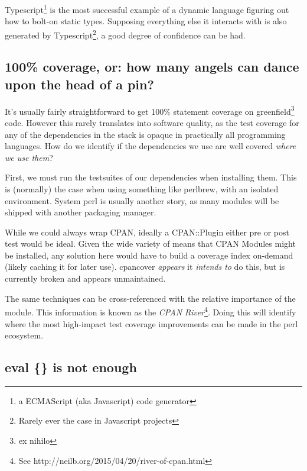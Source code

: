 \documentclass{article}
\begin{document}
Typescript\footnote{a ECMAScript (aka Javascript) code generator} is the most successful example of a dynamic language figuring out how to bolt-on static types.
Supposing everything else it interacts with is also generated by Typescript\footnote{Rarely ever the case in Javascript projects}, a good degree of confidence can be had.

\subsection{100\% coverage, or: how many angels can dance upon the head of a pin?}

It's usually fairly straightforward to get 100\% statement coverage on greenfield\footnote{ex nihilo} code.
However this rarely translates into software quality, as the test coverage for any of the dependencies in the stack is opaque in practically all programming languages.
How do we identify if the dependencies we use are well covered \textit{where we use them}?

First, we must run the testsuites of our dependencies when installing them.
This is (normally) the case when using something like perlbrew, with an isolated environment.
System perl is usually another story, as many modules will be shipped with another packaging manager.

While we could always wrap CPAN, ideally a CPAN::Plugin either pre or post test would be ideal.
Given the wide variety of means that CPAN Modules might be installed, any solution here would have to build a coverage index on-demand (likely caching it for later use).
cpancover \textit{appears} it \textit{intends to} do this, but is currently broken and appears unmaintained.

The same techniques can be cross-referenced with the relative importance of the module.
This information is known as the \textit{CPAN River}\footnote{See http://neilb.org/2015/04/20/river-of-cpan.html}.
Doing this will identify where the most high-impact test coverage improvements can be made in the perl ecosystem.

\subsection{eval \{\} is not enough}
\end{document}
